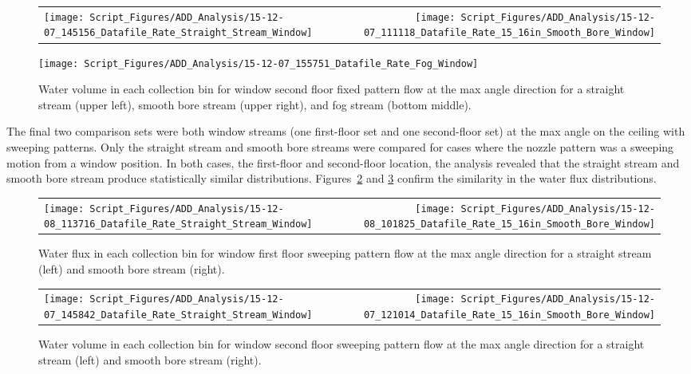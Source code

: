 \documentclass[12pt,oneside]{book}
\begin{document}
\begin{figure}[ht]
\begin{tabular*}{\textwidth}{lr}
\texttt{[image: Script\_Figures/ADD\_Analysis/15-12-07\_145156\_Datafile\_Rate\_Straight\_Stream\_Window]} &
\texttt{[image: Script\_Figures/ADD\_Analysis/15-12-07\_111118\_Datafile\_Rate\_15\_16in\_Smooth\_Bore\_Window]} \\
\end{tabular*}
\centering
\texttt{[image: Script\_Figures/ADD\_Analysis/15-12-07\_155751\_Datafile\_Rate\_Fog\_Window]}
\caption[Water Flux for Varying Window Second Floor Fixed Pattern Hose Stream Types]{Water volume in each collection bin for window second floor fixed pattern flow at the max angle direction for a straight stream (upper left), smooth bore stream (upper right), and fog stream (bottom middle).}
\label{fig:Window_SecondFloor_Fixed_Varying_Nozzle}
\end{figure}

\clearpage

The final two comparison sets were both window streams (one first-floor set and one second-floor set) at the max angle on the ceiling with sweeping patterns. Only the straight stream and smooth bore streams were compared for cases where the nozzle pattern was a sweeping motion from a window position. In both cases, the first-floor and second-floor location, the analysis revealed that the straight stream and smooth bore stream produce statistically similar distributions. Figures~\ref{fig:Window_FirstFloor_O_Varying_Nozzle} and \ref{fig:Window_SecondFloor_O_Varying_Nozzle} confirm the similarity in the water flux distributions.

\begin{figure}[ht]
\begin{tabular*}{\textwidth}{lr}
\texttt{[image: Script\_Figures/ADD\_Analysis/15-12-08\_113716\_Datafile\_Rate\_Straight\_Stream\_Window]} &
\texttt{[image: Script\_Figures/ADD\_Analysis/15-12-08\_101825\_Datafile\_Rate\_15\_16in\_Smooth\_Bore\_Window]}
\end{tabular*}
\caption[Water Flux for Varying Window First Floor Sweeping Pattern Hose Stream Types]{Water flux in each collection bin for window first floor sweeping pattern flow at the max angle direction for a straight stream (left) and smooth bore stream (right).}
\label{fig:Window_FirstFloor_O_Varying_Nozzle}
\end{figure}

\begin{figure}[ht]
\begin{tabular*}{\textwidth}{lr}
\texttt{[image: Script\_Figures/ADD\_Analysis/15-12-07\_145842\_Datafile\_Rate\_Straight\_Stream\_Window]} &
\texttt{[image: Script\_Figures/ADD\_Analysis/15-12-07\_121014\_Datafile\_Rate\_15\_16in\_Smooth\_Bore\_Window]}
\end{tabular*}
\caption[Water Flux for Varying Window Second Floor Sweeping Pattern Hose Stream Types]{Water volume in each collection bin for window second floor sweeping pattern flow at the max angle direction for a straight stream (left) and smooth bore stream (right).}
\label{fig:Window_SecondFloor_O_Varying_Nozzle}
\end{figure}
\end{document}

